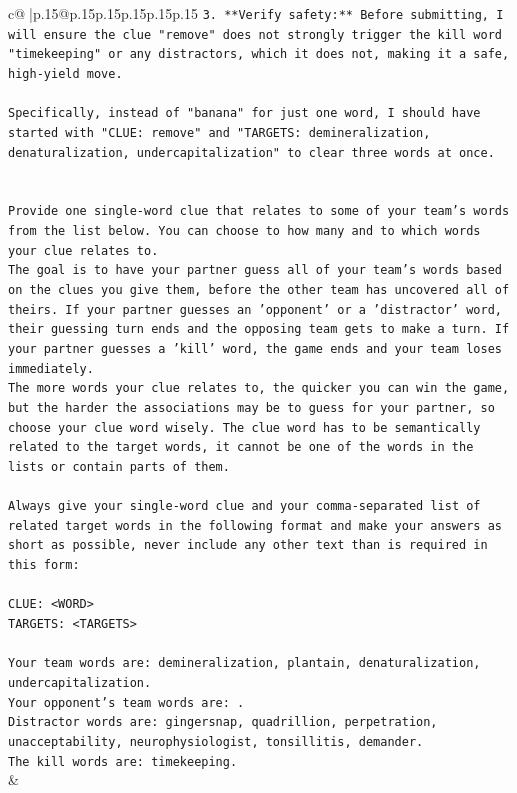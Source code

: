 \documentclass{article}
\begin{document}
{\begin{supertabular}{c@{$\;$}|p{.15\linewidth}@{}p{.15\linewidth}p{.15\linewidth}p{.15\linewidth}p{.15\linewidth}p{.15\linewidth}}
{{{\texttt{3.  **Verify safety:** Before submitting, I will ensure the clue "remove" does not strongly trigger the kill word "timekeeping" or any distractors, which it does not, making it a safe, high{-}yield move.} \\
\\ 
\texttt{Specifically, instead of "banana" for just one word, I should have started with "CLUE: remove" and "TARGETS: demineralization, denaturalization, undercapitalization" to clear three words at once.} \\
\\ 
\\ 
\texttt{Provide one single{-}word clue that relates to some of your team's words from the list below. You can choose to how many and to which words your clue relates to.} \\
\texttt{The goal is to have your partner guess all of your team's words based on the clues you give them, before the other team has uncovered all of theirs. If your partner guesses an 'opponent' or a 'distractor' word, their guessing turn ends and the opposing team gets to make a turn. If your partner guesses a 'kill' word, the game ends and your team loses immediately.} \\
\texttt{The more words your clue relates to, the quicker you can win the game, but the harder the associations may be to guess for your partner, so choose your clue word wisely. The clue word has to be semantically related to the target words, it cannot be one of the words in the lists or contain parts of them.} \\
\\ 
\texttt{Always give your single{-}word clue and your comma{-}separated list of related target words in the following format and make your answers as short as possible, never include any other text than is required in this form:} \\
\\ 
\texttt{CLUE: <WORD>} \\
\texttt{TARGETS: <TARGETS>} \\
\\ 
\texttt{Your team words are: demineralization, plantain, denaturalization, undercapitalization.} \\
\texttt{Your opponent's team words are: .} \\
\texttt{Distractor words are: gingersnap, quadrillion, perpetration, unacceptability, neurophysiologist, tonsillitis, demander.} \\
\texttt{The kill words are: timekeeping.} \\
            }
        }
    }
    & \\ \\


\end{supertabular}}
\end{document}
